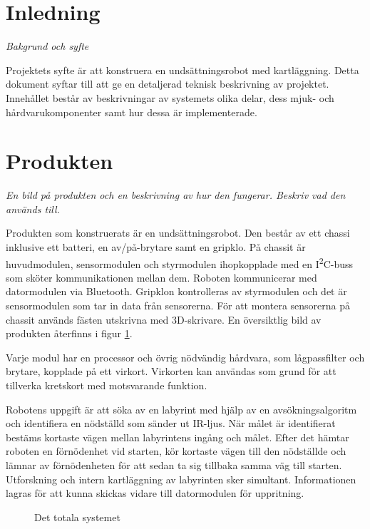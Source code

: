 \documentclass[11pt]{article}
\begin{document}
\begin{flushleft}
\section{Inledning}
\textit{Bakgrund och syfte}

Projektets syfte är att konstruera en undsättningsrobot med kartläggning. Detta dokument syftar till att ge en detaljerad teknisk beskrivning av projektet. Innehållet består av beskrivningar av systemets olika delar, dess mjuk- och hårdvarukomponenter samt hur dessa är implementerade.

\section{Produkten}
\textit{En bild på produkten och en beskrivning av hur den fungerar. Beskriv vad den används till.}

Produkten som konstruerats är en undsättningsrobot. Den består av ett chassi inklusive ett batteri, en av/på-brytare samt en gripklo. På chassit är huvudmodulen, sensormodulen och styrmodulen ihopkopplade med en I\textsuperscript{2}C-buss som sköter kommunikationen mellan dem. Roboten kommunicerar med datormodulen via Bluetooth\textsuperscript{\circledR}. Gripklon kontrolleras av styrmodulen och  det är sensormodulen som tar in data från sensorerna. För att montera sensorerna på chassit används fästen utskrivna med 3D-skrivare. En översiktlig bild av produkten återfinns i figur \ref{overview}.

Varje modul har en processor och övrig nödvändig hårdvara, som lågpassfilter och brytare, kopplade på ett virkort. Virkorten kan användas som grund för att tillverka kretskort med motsvarande funktion. 

Robotens uppgift är att söka av en labyrint med hjälp av en avsökningsalgoritm och identifiera en nödställd som sänder ut IR-ljus. När målet är identifierat bestäms kortaste vägen mellan labyrintens ingång och målet. Efter det hämtar roboten en förnödenhet vid starten, kör kortaste vägen till den nödställde och lämnar av förnödenheten för att sedan ta sig tillbaka samma väg till starten. Utforskning och intern kartläggning av labyrinten sker simultant. Informationen lagras för att kunna skickas vidare till datormodulen för uppritning. 


\begin{figure}[!htbp]
\centering
\noindent\resizebox{\linewidth}{!}{
	}
	\caption{Det totala systemet \label{overview}}	
\end{figure}


\end{flushleft}
\end{document}
